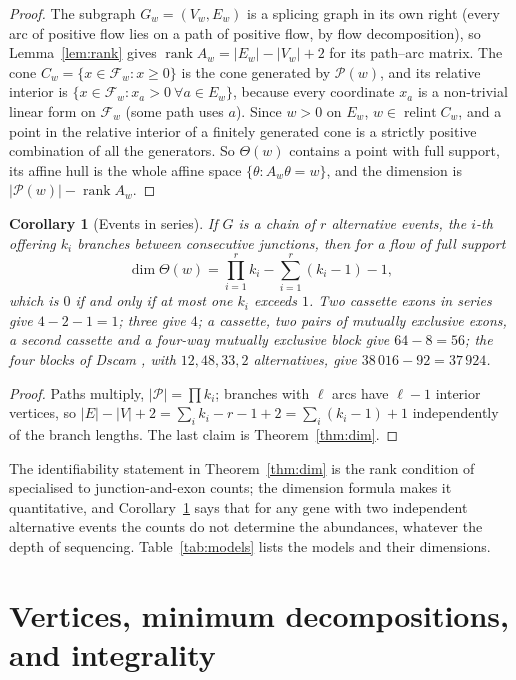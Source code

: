\documentclass[11pt]{article}
\theoremstyle{plain}
\newtheorem{corollary}[theorem]{Corollary}
\theoremstyle{definition}
\theoremstyle{remark}
\newcommand{\rank}{\operatorname{rank}}
\newcommand{\relint}{\operatorname{relint}}
\newcommand{\Th}{\Theta}
\begin{document}
\begin{proof}
The subgraph $G_w=(V_w,E_w)$ is a splicing graph in its own right (every arc of positive flow
lies on a path of positive flow, by flow decomposition), so Lemma~\ref{lem:rank} gives
$\rank A_w=|E_w|-|V_w|+2$ for its path--arc matrix. The cone $C_w=\{x\in\mathcal F_w:x\ge0\}$
is the cone generated by $\mathcal P(w)$, and its relative interior is $\{x\in\mathcal
F_w:x_a>0\ \forall a\in E_w\}$, because every coordinate $x_a$ is a non-trivial linear form
on $\mathcal F_w$ (some path uses $a$). Since $w>0$ on $E_w$, $w\in\relint C_w$, and a point
in the relative interior of a finitely generated cone is a strictly positive combination of
all the generators. So $\Th(w)$ contains a point with full support, its affine hull is the
whole affine space $\{\theta:A_w\theta=w\}$, and the dimension is $|\mathcal P(w)|-\rank A_w$.
\end{proof}

\begin{corollary}[Events in series]\label{cor:series}
If $G$ is a chain of $r$ alternative events, the $i$-th offering $k_i$ branches between
consecutive junctions, then for a flow of full support
\[
  \dim\Th(w)=\prod_{i=1}^r k_i-\sum_{i=1}^r(k_i-1)-1 ,
\]
which is $0$ if and only if at most one $k_i$ exceeds $1$. Two cassette exons in series give
$4-2-1=1$; three give $4$; a cassette, two pairs of mutually exclusive exons, a second
cassette and a four-way mutually exclusive block give $64-8=56$; the four blocks of
\emph{Dscam} \cite{SCH00}, with $12,48,33,2$ alternatives, give $38\,016-92=37\,924$.
\end{corollary}

\begin{proof}
Paths multiply, $|\mathcal P|=\prod k_i$; branches with $\ell$ arcs have $\ell-1$ interior
vertices, so $|E|-|V|+2=\sum_i k_i-r-1+2=\sum_i(k_i-1)+1$ independently of the branch
lengths. The last claim is Theorem~\ref{thm:dim}.
\end{proof}

The identifiability statement in Theorem~\ref{thm:dim} is the rank condition of
\cite{HJXW09} specialised to junction-and-exon counts; the dimension formula makes it
quantitative, and Corollary~\ref{cor:series} says that for any gene with two independent
alternative events the counts do not determine the abundances, whatever the depth of
sequencing. Table~\ref{tab:models} lists the models and their dimensions.

\section{Vertices, minimum decompositions, and integrality}\label{sec:vertices}
\end{document}
